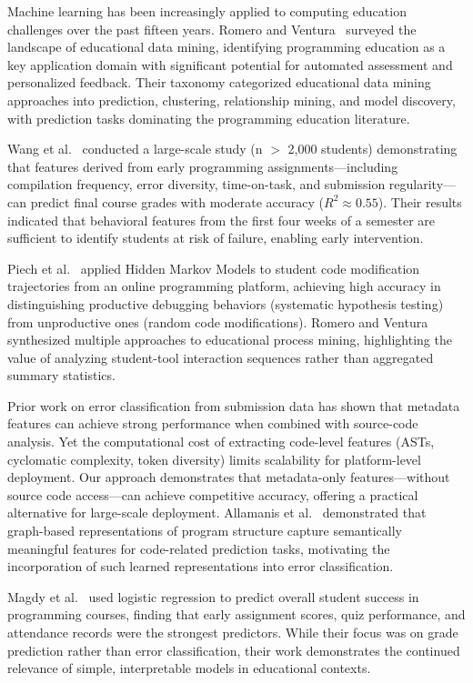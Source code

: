 \documentclass[10pt,a4paper]{article}
\begin{document}
Machine learning has been increasingly applied to computing education
challenges over the past fifteen years. Romero and
Ventura~\cite{romero2013data}
surveyed the landscape of educational data mining, identifying programming
education as a key application domain with significant potential for automated
assessment and personalized feedback. Their taxonomy categorized educational
data mining approaches into prediction, clustering, relationship mining, and
model discovery, with prediction tasks dominating the programming education
literature.

Wang et al.~\cite{wang2017learning} conducted a large-scale study (n $>$ 2,000
students) demonstrating that features derived from early programming
assignments---including compilation frequency, error diversity, time-on-task,
and submission regularity---can predict final course grades with moderate
accuracy ($R^2 \approx 0.55$). Their results indicated that behavioral
features from the first four weeks of a semester are sufficient to identify
students at risk of failure, enabling early intervention.

Piech et al.~\cite{effenberger2021validity} applied Hidden Markov Models to
student code modification trajectories from an online programming platform,
achieving high accuracy in distinguishing productive debugging behaviors
(systematic hypothesis testing) from unproductive ones (random code
modifications). Romero and Ventura~\cite{romero2013data}
synthesized multiple approaches to educational process mining, highlighting the
value of analyzing student-tool interaction sequences rather than aggregated
summary statistics.

Prior work on error classification from submission data has shown that
metadata features can achieve strong performance when combined with
source-code analysis. Yet the computational cost of extracting
code-level features (ASTs, cyclomatic complexity, token diversity)
limits scalability for platform-level deployment. Our approach demonstrates
that metadata-only features---without source code access---can achieve
competitive accuracy, offering a practical alternative for large-scale
deployment. Allamanis et al.~\cite{allamanis2018learning} demonstrated that
graph-based representations of program structure capture semantically
meaningful features for code-related prediction tasks, motivating the
incorporation of such learned representations into error classification.

Magdy et al.~\cite{alnahhas2020predicting} used logistic regression to predict
overall student success in programming courses, finding that early assignment
scores, quiz performance, and attendance records were the strongest predictors.
While their focus was on grade prediction rather than error classification,
their work demonstrates the continued relevance of simple, interpretable models
in educational contexts.
\end{document}
